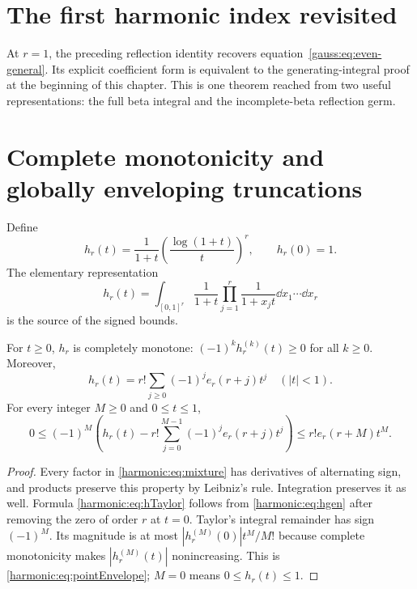 \section{The first harmonic index revisited}
At $r=1$, the preceding reflection identity recovers
equation~\eqref{gauss:eq:even-general}. Its explicit coefficient form is
equivalent to the generating-integral proof at the beginning of this
chapter. This is one theorem reached from two useful representations:
the full beta integral and the incomplete-beta reflection germ.

\section{Complete monotonicity and globally enveloping truncations}
\label{harmonic:sec:envelopes}

Define
\begin{equation}\label{harmonic:eq:h}
 h_r(t)=\frac1{1+t}\left(\frac{\log(1+t)}t\right)^r,
 \qquad h_r(0)=1.
\end{equation}
The elementary representation
\begin{equation}\label{harmonic:eq:mixture}
 h_r(t)=\int_{[0,1]^r}\frac1{1+t}\prod_{j=1}^r\frac1{1+x_jt}
                  \dd x_1\cdots\dd x_r
\end{equation}
is the source of the signed bounds.

\begin{lemma}\label{harmonic:lem:CM}
For $t\ge0$, $h_r$ is completely monotone: $(-1)^k h_r^{(k)}(t)\ge0$ for all $k\ge0$. Moreover,
\begin{equation}\label{harmonic:eq:hTaylor}
 h_r(t)=r!\sum_{j\ge0}(-1)^j e_r(r+j)t^j\quad (|t|<1).
\end{equation}
For every integer $M\ge0$ and $0\le t\le1$,
\begin{equation}\label{harmonic:eq:pointEnvelope}
 0\le(-1)^M\left(h_r(t)-r!\sum_{j=0}^{M-1}(-1)^je_r(r+j)t^j\right)
       \le r!e_r(r+M)t^M.
\end{equation}
\end{lemma}
\begin{proof}
Every factor in \eqref{harmonic:eq:mixture} has derivatives of alternating sign, and products preserve this property by Leibniz's rule. Integration preserves it as well. Formula \eqref{harmonic:eq:hTaylor} follows from \eqref{harmonic:eq:hgen} after removing the zero of order $r$ at $t=0$. Taylor's integral remainder has sign $(-1)^M$. Its magnitude is at most $|h_r^{(M)}(0)|t^M/M!$ because complete monotonicity makes $|h_r^{(M)}(t)|$ nonincreasing. This is \eqref{harmonic:eq:pointEnvelope}; $M=0$ means $0\le h_r(t)\le1$.
\end{proof}

